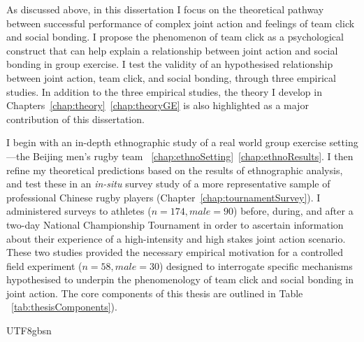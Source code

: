 \begin{CJK}{UTF8}{gbsn}
As discussed above, in this dissertation I focus on the theoretical pathway between successful performance of complex joint action and feelings of team click and social bonding.  I propose the phenomenon of team click as a psychological construct that can help explain a relationship between joint action and social bonding in group exercise.  I test the validity of an hypothesised relationship between joint action, team click, and social bonding, through three empirical studies.  In addition to the three empirical studies, the theory I develop in Chapters~\ref{chap:theory}\nobreakdash~\ref{chap:theoryGE} is also highlighted as a major contribution of this dissertation.

I begin with an in-depth ethnographic study of a real world group exercise setting---the Beijing men's rugby team ~\ref{chap:ethnoSetting}\nobreakdash~\ref{chap:ethnoResults}.  I then refine my theoretical predictions based on the results of ethnographic analysis, and test these in an \textit{in-situ} survey study of a more representative sample of professional Chinese rugby players (Chapter~\ref{chap:tournamentSurvey}). I administered surveys to athletes ($n = 174, male = 90$) before, during, and after a two-day National Championship Tournament in order to ascertain information about their experience of a high-intensity and high stakes joint action scenario.  These two studies provided the necessary empirical motivation for a controlled field experiment ($n = 58, male = 30$) designed to interrogate specific mechanisms hypothesised to underpin the phenomenology of team click and social bonding in joint action.  The core components of this thesis are outlined in Table  ~\ref{tab:thesisComponents}).











\end{CJK}{UTF8}{gbsn}
